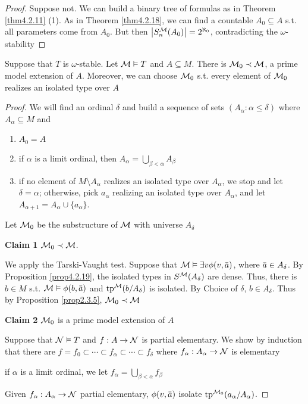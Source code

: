 \documentclass[11pt]{article}
\begin{document}
\begin{proof}
Suppose not. We can build a binary tree of formulas as in Theorem \ref{thm4.2.11} (1). As in
Theorem \ref{thm4.2.18}, we can find a countable \(A_0\subseteq A\) s.t. all parameters come from \(A_0\).
But then \(\abs{S_n^{\calm}(A_0)}=2^{\aleph_0}\), contradicting the \(\omega\)-stability
\end{proof}

\begin{theorem}[]
Suppose that \(T\) is \(\omega\)-stable. Let \(\mathcal{M}\vDash T\) and \(A\subseteq M\). There is \(\mathcal{M}_0\prec\mathcal{M}\), a prime model
extension of \(A\). Moreover, we can choose \(\mathcal{M}_0\) s.t. every element of \(\mathcal{M}_0\) realizes an
isolated type over \(A\)
\end{theorem}

\begin{proof}
We will find an ordinal \(\delta\) and build a sequence of sets \((A_\alpha:\alpha\le\delta)\) where \(A_\alpha\subseteq M\) and
\begin{enumerate}
\item \(A_0=A\)
\item if \(\alpha\) is a limit ordinal, then \(A_\alpha=\bigcup_{\beta<\alpha}A_\beta\)
\item if no element of \(M\setminus A_\alpha\) realizes an isolated type over \(A_\alpha\), we stop and let \(\delta=\alpha\);
otherwise, pick \(a_\alpha\) realizing an isolated type over \(A_\alpha\), and
let \(A_{\alpha+1}=A_\alpha\cup\{a_\alpha\}\).
\end{enumerate}

Let \(\mathcal{M}_0\) be the substructure of \(\mathcal{M}\) with universe \(A_\delta\)


\textbf{Claim 1} \(\mathcal{M}_0\prec\mathcal{M}\).

We apply the Tarski-Vaught test. Suppose that \(\calm\vDash\exists v\phi(v,\bara)\), where \(\bara\in A_\delta\). By
Proposition \ref{prop4.2.19}, the isolated types in \(S^{\mathcal{M}}(A_\delta)\) are dense. Thus, there
is \(b\in M\) s.t. \(\calm\vDash\phi(b,\bara)\) and \(\operatorname{tp}^{\mathcal{M}}(b/A_\delta)\) \label{Problem4} is isolated. By Choice of
\(\delta\), \(b\in A_\delta\). Thus by Proposition \ref{prop2.3.5}, \(\mathcal{M}_0\prec\mathcal{M}\)

\textbf{Claim 2} \(\mathcal{M}_0\) is a prime model extension of \(A\)

Suppose that \(\mathcal{N}\vDash T\) and \(f:A\to\mathcal{N}\) is partial elementary. We show by induction that there
are \(f=f_0\subset\cdots\subset f_\alpha\subset\cdots\subset f_\delta\) where \(f_\alpha:A_\alpha\to\mathcal{N}\) is elementary

if \(\alpha\) is a limit ordinal, we let \(f_\alpha=\bigcup_{\beta<\alpha}f_\beta\)

Given \(f_\alpha:A_\alpha\to\mathcal{N}\) partial elementary, \(\phi(v,\bara)\) isolate \(\operatorname{tp}^{\mathcal{M}_0}(a_\alpha/A_\alpha)\).
\end{proof}
\end{document}

